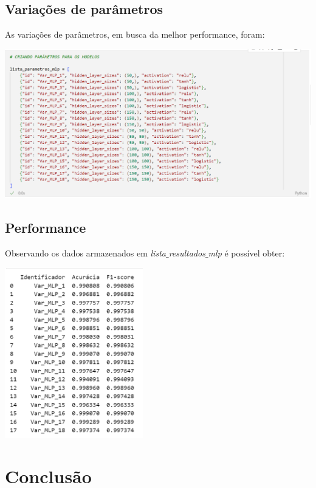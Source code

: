 \documentclass[12pt,a4paper]{article}
\begin{document}
\vspace{0.5cm}
\subsection{Variações de parâmetros}

\quad\space As variações de parâmetros, em busca da melhor performance, foram:

\begin{center}
	\includegraphics[width=\textwidth]{imagem/mlpp.png}
\end{center}

\subsection{Performance}

\quad\space Observando os dados armazenados em \textit{lista$\_$resultados$\_$mlp} é possível obter:

\begin{center}
	\includegraphics[width=6cm]{imagem/mlpr.png}
\end{center}
\newpage
\section{Conclusão}
\end{document}
